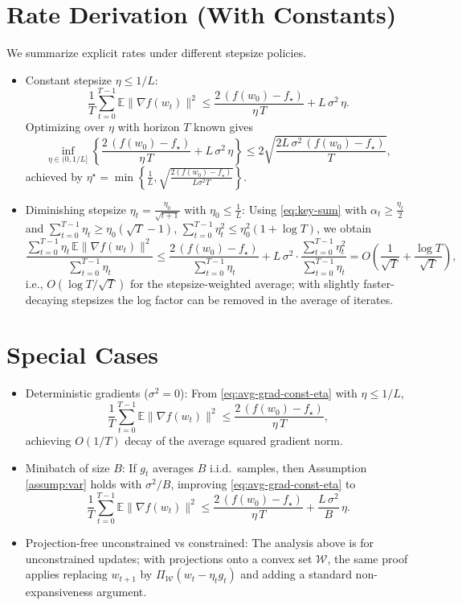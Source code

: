 \documentclass[11pt]{article}
\begin{document}
\section*{Rate Derivation (With Constants)}
We summarize explicit rates under different stepsize policies.
\begin{itemize}
    \item Constant stepsize $\eta \le 1/L$:
    \[
    \frac{1}{T}\sum_{t=0}^{T-1} \mathbb{E}\|\nabla f(w_t)\|^2
    \le \frac{2\,(f(w_0)-f_\star)}{\eta\,T} + L\,\sigma^2\,\eta.
    \]
    Optimizing over $\eta$ with horizon $T$ known gives
    \[
    \inf_{\eta\in(0,1/L]} \left\{\frac{2\,(f(w_0)-f_\star)}{\eta\,T} + L\,\sigma^2\,\eta \right\}
    \le 2\sqrt{\frac{2L\,\sigma^2\,(f(w_0)-f_\star)}{T}},
    \]
    achieved by $\eta^\star = \min\left\{\frac{1}{L}, \sqrt{\frac{2(f(w_0)-f_\star)}{L\sigma^2 T}}\right\}$.
    \item Diminishing stepsize $\eta_t = \frac{\eta_0}{\sqrt{t+1}}$ with $\eta_0 \le \frac{1}{L}$:
    Using \eqref{eq:key-sum} with $\alpha_t \ge \frac{\eta_t}{2}$ and $\sum_{t=0}^{T-1} \eta_t \ge \eta_0(\sqrt{T}-1)$, $\sum_{t=0}^{T-1} \eta_t^2 \le \eta_0^2(1+\log T)$, we obtain
    \[
    \frac{\sum_{t=0}^{T-1} \eta_t\, \mathbb{E}\|\nabla f(w_t)\|^2}{\sum_{t=0}^{T-1} \eta_t}
    \le \frac{2\,(f(w_0)-f_\star)}{\sum_{t=0}^{T-1} \eta_t} + L\,\sigma^2 \cdot \frac{\sum_{t=0}^{T-1} \eta_t^2}{\sum_{t=0}^{T-1} \eta_t}
    = O\!\left(\frac{1}{\sqrt{T}} + \frac{\log T}{\sqrt{T}}\right),
    \]
    i.e., $O(\log T/\sqrt{T})$ for the stepsize-weighted average; with slightly faster-decaying stepsizes the log factor can be removed in the average of iterates.
\end{itemize}

\section*{Special Cases}
\begin{itemize}
    \item Deterministic gradients ($\sigma^2=0$): From \eqref{eq:avg-grad-const-eta} with $\eta\le 1/L$,
    \[
    \frac{1}{T}\sum_{t=0}^{T-1} \mathbb{E}\|\nabla f(w_t)\|^2
    \le \frac{2\,(f(w_0)-f_\star)}{\eta\,T},
    \]
    achieving $O(1/T)$ decay of the average squared gradient norm.
    \item Minibatch of size $B$: If $g_t$ averages $B$ i.i.d.\ samples, then Assumption \ref{assump:var} holds with $\sigma^2/B$, improving \eqref{eq:avg-grad-const-eta} to
    \[
    \frac{1}{T}\sum_{t=0}^{T-1} \mathbb{E}\|\nabla f(w_t)\|^2
    \le \frac{2\,(f(w_0)-f_\star)}{\eta\,T} + \frac{L\,\sigma^2}{B}\,\eta.
    \]
    \item Projection-free unconstrained vs constrained: The analysis above is for unconstrained updates; with projections onto a convex set $\mathcal{W}$, the same proof applies replacing $w_{t+1}$ by $\Pi_{\mathcal{W}}(w_t-\eta_t g_t)$ and adding a standard non-expansiveness argument.
\end{itemize}
\end{document}
